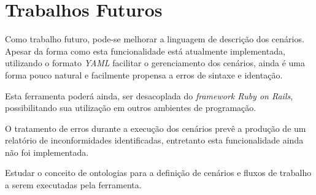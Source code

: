 \section{Trabalhos Futuros}

Como trabalho futuro, pode-se melhorar a linguagem de descrição dos cenários. Apesar da forma como esta funcionalidade está atualmente implementada, utilizando o formato \textit{YAML} facilitar o gerenciamento dos cenários, ainda é uma forma pouco natural e facilmente propensa a erros de sintaxe e identação.

Esta ferramenta poderá ainda, ser desacoplada do \textit{framework Ruby on Rails}, possibilitando sua utilização em outros ambientes de programação.

O tratamento de erros durante a execução dos cenários prevê a produção de um relatório de inconformidades identificadas, entretanto esta funcionalidade ainda não foi implementada.

Estudar o conceito de ontologias para a definição de cenários e fluxos de trabalho a serem executadas pela ferramenta.